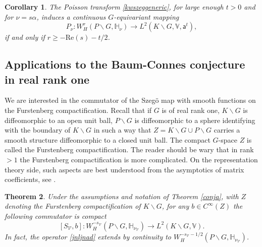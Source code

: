 \documentclass[a4paper,reqno]{amsart}
\numberwithin{equation}{section}
\newtheorem{thm1}{Theorem}
\newtheorem{cor1}[thm1]{Corollary}
\theoremstyle{definition}
\theoremstyle{remark}
\begin{document}
\begin{cor1}
\label{remarkkwszeggeneric}
The Poisson transform \eqref{kwszeggeneric}, for large enough $t>0$ and for $\nu=s\alpha$, induces a continuous $G$-equivariant mapping 
$$P_\nu: W^{r}_{H}(P\backslash G, \mathbb{H}_{\nu})\to L^2(K \backslash G,\mathbb{V},\mathsf{a}^t),$$
if and only if $r\geq -\mathrm{Re}(s)-t/2$.
\end{cor1}


\subsection{Applications to the Baum-Connes conjecture in real rank one} 
We are interested in the commutator of the Szegö map with smooth functions on the Furstenberg compactification. Recall that if $G$ is of real rank one, $K\backslash G$ is diffeomorphic to an open unit ball, $P\backslash G$ is diffeomorphic to a sphere identifying with the boundary of $K\backslash G$ in such a way that $Z=K\backslash G\cup P\backslash G$ carries a smooth structure diffeomorphic to a closed unit ball. The compact $G$-space $Z$ is called the Furstenberg compactification. The reader should be wary that in rank $>1$ the Furstenberg compactification is more complicated. On the representation theory side, such aspects are best understood from the asymptotics of matrix coefficients, see \cite{knappbook,vcbschlich,wallachbook}.

\begin{thm1}
\label{conjb}
Under the assumptions and  notation of Theorem \ref{conja}, with $Z$ denoting the Furstenberg compactification of $K\backslash G$, for any $b\in C^\infty(Z)$ the following commutator is compact
\begin{equation} 
\label{jnljnad}
[S_{\mathcal{V}},b]: W^{-s_\mathcal{V}}_{H}(P\backslash G, \mathbb{H}_{\nu_{\mathcal{V}}})\to L^2(K \backslash G,\mathbb{V}).
\end{equation}
In fact, the operator \eqref{jnljnad} extends by continuity to $W^{-s_{\mathcal{V}}-1/2}_{H}(P\backslash G, \mathbb{H}_{\nu_{\mathcal{V}}})$.
\end{thm1}
\end{document}
